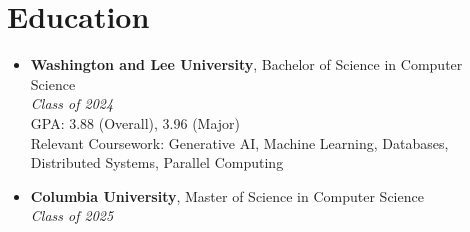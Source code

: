 \section*{Education}
\begin{itemize}[leftmargin=*]
    \item \textbf{Washington and Lee University}, Bachelor of Science in Computer Science \\
    \textit{Class of 2024} \\
    GPA: 3.88 (Overall), 3.96 (Major) \\
    Relevant Coursework: Generative AI, Machine Learning, Databases, Distributed Systems, Parallel Computing

    \item \textbf{Columbia University}, Master of Science in Computer Science \\
    \textit{Class of 2025}
\end{itemize}
